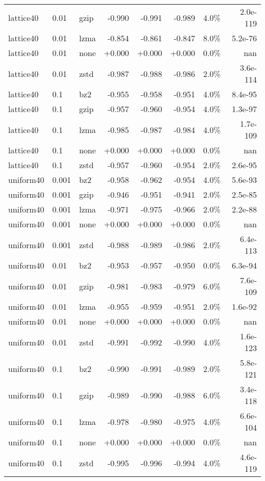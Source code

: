 \begin{table}[h!]
\begin{tabular}{l l l r r r r r}
lattice40 & 0.01 & gzip & -0.990 & -0.991 & -0.989 & 4.0\% & 2.0e-119\\
lattice40 & 0.01 & lzma & -0.854 & -0.861 & -0.847 & 8.0\% & 5.2e-76\\
lattice40 & 0.01 & none & +0.000 & +0.000 & +0.000 & 0.0\% & nan\\
lattice40 & 0.01 & zstd & -0.987 & -0.988 & -0.986 & 2.0\% & 3.6e-114\\
\midrule
lattice40 & 0.1 & bz2 & -0.955 & -0.958 & -0.951 & 4.0\% & 8.4e-95\\
lattice40 & 0.1 & gzip & -0.957 & -0.960 & -0.954 & 4.0\% & 1.3e-97\\
lattice40 & 0.1 & lzma & -0.985 & -0.987 & -0.984 & 4.0\% & 1.7e-109\\
lattice40 & 0.1 & none & +0.000 & +0.000 & +0.000 & 0.0\% & nan\\
lattice40 & 0.1 & zstd & -0.957 & -0.960 & -0.954 & 2.0\% & 2.6e-95\\
\midrule
uniform40 & 0.001 & bz2 & -0.958 & -0.962 & -0.954 & 4.0\% & 5.6e-93\\
uniform40 & 0.001 & gzip & -0.946 & -0.951 & -0.941 & 2.0\% & 2.5e-85\\
uniform40 & 0.001 & lzma & -0.971 & -0.975 & -0.966 & 2.0\% & 2.2e-88\\
uniform40 & 0.001 & none & +0.000 & +0.000 & +0.000 & 0.0\% & nan\\
uniform40 & 0.001 & zstd & -0.988 & -0.989 & -0.986 & 2.0\% & 6.4e-113\\
\midrule
uniform40 & 0.01 & bz2 & -0.953 & -0.957 & -0.950 & 0.0\% & 6.3e-94\\
uniform40 & 0.01 & gzip & -0.981 & -0.983 & -0.979 & 6.0\% & 7.6e-109\\
uniform40 & 0.01 & lzma & -0.955 & -0.959 & -0.951 & 2.0\% & 1.6e-92\\
uniform40 & 0.01 & none & +0.000 & +0.000 & +0.000 & 0.0\% & nan\\
uniform40 & 0.01 & zstd & -0.991 & -0.992 & -0.990 & 4.0\% & 1.6e-123\\
\midrule
uniform40 & 0.1 & bz2 & -0.990 & -0.991 & -0.989 & 2.0\% & 5.8e-121\\
uniform40 & 0.1 & gzip & -0.989 & -0.990 & -0.988 & 6.0\% & 3.4e-118\\
uniform40 & 0.1 & lzma & -0.978 & -0.980 & -0.975 & 4.0\% & 6.6e-104\\
uniform40 & 0.1 & none & +0.000 & +0.000 & +0.000 & 0.0\% & nan\\
uniform40 & 0.1 & zstd & -0.995 & -0.996 & -0.994 & 4.0\% & 4.6e-119\\

\end{tabular}
\end{table}
